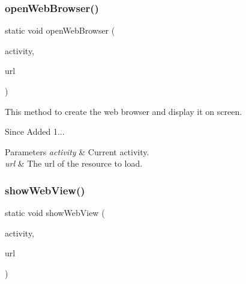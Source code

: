 \subsubsection{\texorpdfstring{open\+Web\+Browser()}{openWebBrowser()}}
{\footnotesize\ttfamily static void open\+Web\+Browser (\begin{DoxyParamCaption}\item[{@Non\+Null final Activity}]{activity,  }\item[{@Non\+Null final String}]{url }\end{DoxyParamCaption})\hspace{0.3cm}{\ttfamily [static]}}



This method to create the web browser and display it on screen. 

\begin{DoxySince}{Since}
Added 1... 
\end{DoxySince}

\begin{DoxyParams}{Parameters}
{\em activity} & Current activity. \\
\hline
{\em url} & The url of the resource to load. \\
\hline
\end{DoxyParams}
\mbox{\label{classcom_1_1toast_1_1android_1_1gamebase_1_1_gamebase_1_1_web_view_ae3429d5340c6164295dc3ce3c3eb1b4c}} 
\subsubsection{\texorpdfstring{show\+Web\+View()}{showWebView()}\hspace{0.1cm}{\footnotesize\ttfamily [1/3]}}
{\footnotesize\ttfamily static void show\+Web\+View (\begin{DoxyParamCaption}\item[{@Non\+Null final Activity}]{activity,  }\item[{@Non\+Null final String}]{url }\end{DoxyParamCaption})\hspace{0.3cm}{\ttfamily [static]}}



